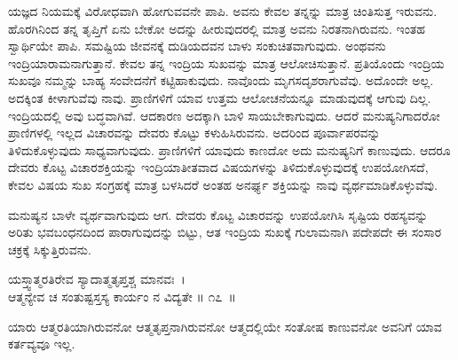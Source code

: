 ಯಜ್ಞದ ನಿಯಮಕ್ಕೆ ವಿರೋಧವಾಗಿ ಹೋಗುವವನೇ ಪಾಪಿ. ಅವನು ಕೇವಲ ತನ್ನನ್ನು ಮಾತ್ರ ಚಿಂತಿಸುತ್ತ ಇರುವನು. ಹೊರಗಿನಿಂದ ತನ್ನ ತೃಪ್ತಿಗೆ ಏನು ಬೇಕೋ ಅದನ್ನು ಹೀರುವುದರಲ್ಲಿ ಮಾತ್ರ ಅವನು ನಿರತನಾಗಿರುವನು. ಇಂತಹ ಸ್ವಾರ್ಥಿಯೇ ಪಾಪಿ. ಸಮಷ್ಟಿಯ ಜೀವನಕ್ಕೆ ದುಡಿಯದವನ ಬಾಳು ಸಂಕುಚಿತವಾಗುವುದು. ಅಂಥವನು ಇಂದ್ರಿಯಾರಾಮನಾಗುತ್ತಾನೆ. ಕೇವಲ ತನ್ನ ಇಂದ್ರಿಯ ಸುಖವನ್ನು ಮಾತ್ರ ಆಲೋಚಿಸುತ್ತಾನೆ. ಪ್ರತಿಯೊಂದು ಇಂದ್ರಿಯ ಸುಖವೂ ನಮ್ಮನ್ನು ಬಾಹ್ಯ ಸಂವೇದನೆಗೆ ಕಟ್ಟಿಹಾಕುವುದು. ನಾವೊಂದು ಮೃಗಸದೃಶರಾಗುವೆವು. ಅದೊಂದೇ ಅಲ್ಲ. ಅದಕ್ಕಿಂತ ಕೀಳಾಗುವೆವು ನಾವು. ಪ್ರಾಣಿಗಳಿಗೆ ಯಾವ ಉತ್ತಮ ಆಲೋಚನೆಯನ್ನೂ ಮಾಡುವುದಕ್ಕೆ ಆಗುವು ದಿಲ್ಲ. ಇಂದ್ರಿಯದಲ್ಲಿ ಅವು ಬದ್ಧವಾಗಿವೆ. ಆದಕಾರಣ ಅದಕ್ಕಾಗಿ ಬಾಳಿ ಸಾಯಬೇಕಾಗುವುದು. ಆದರೆ ಮನುಷ್ಯನಿಗಾದರೋ ಪ್ರಾಣಿಗಳಲ್ಲಿ ಇಲ್ಲದ ವಿಚಾರವನ್ನು ದೇವರು ಕೊಟ್ಟು ಕಳುಹಿಸಿರುವನು. ಅದರಿಂದ ಪೂರ್ವಾಪರವನ್ನು ತಿಳಿದುಕೊಳ್ಳುವುದು ಸಾಧ್ಯವಾಗುವುದು. ಪ್ರಾಣಿಗಳಿಗೆ ಯಾವುದು ಕಾಣದೋ ಅದು ಮನುಷ್ಯನಿಗೆ ಕಾಣುವುದು. ಆದರೂ ದೇವರು ಕೊಟ್ಟ ವಿಚಾರಶಕ್ತಿಯನ್ನು ಇಂದ್ರಿಯಾತೀತವಾದ ವಿಷಯಗಳನ್ನು ತಿಳಿದುಕೊಳ್ಳುವುದಕ್ಕೆ ಉಪಯೋಗಿಸದೆ, ಕೇವಲ ವಿಷಯ ಸುಖ ಸಂಗ್ರಹಕ್ಕೆ ಮಾತ್ರ ಬಳಸಿದರೆ ಅಂತಹ ಅನರ್ಘ್ಯ ಶಕ್ತಿಯನ್ನು ನಾವು ವ್ಯರ್ಥಮಾಡಿಕೊಳ್ಳುವೆವು.

ಮನುಷ್ಯನ ಬಾಳೇ ವ್ಯರ್ಥವಾಗುವುದು ಆಗ. ದೇವರು ಕೊಟ್ಟ ವಿಚಾರವನ್ನು ಉಪಯೋಗಿಸಿ ಸೃಷ್ಟಿಯ ರಹಸ್ಯವನ್ನು ಅರಿತು ಭವಬಂಧನದಿಂದ ಪಾರಾಗುವುದನ್ನು ಬಿಟ್ಟು, ಆತ ಇಂದ್ರಿಯ ಸುಖಕ್ಕೆ ಗುಲಾಮನಾಗಿ ಪದೇಪದೇ ಈ ಸಂಸಾರ ಚಕ್ರಕ್ಕೆ ಸಿಕ್ಕುತ್ತಿರುವನು.

\begin{shloka}
ಯಸ್ತ್ವಾತ್ಮರತಿರೇವ ಸ್ಯಾದಾತ್ಮತೃಪ್ತಶ್ಚ ಮಾನವಃ~।\\ಆತ್ಮನ್ಯೇವ ಚ ಸಂತುಷ್ಟಸ್ತಸ್ಯ ಕಾರ್ಯಂ ನ ವಿದ್ಯತೇ \hfill॥ ೧೭~॥
\end{shloka}

\begin{artha}
ಯಾರು ಆತ್ಮರತಿಯಾಗಿರುವನೋ ಆತ್ಮತೃಪ್ತನಾಗಿರುವನೋ ಆತ್ಮದಲ್ಲಿಯೇ ಸಂತೋಷ ಕಾಣು\-ವನೋ ಅವನಿಗೆ ಯಾವ ಕರ್ತವ್ಯವೂ ಇಲ್ಲ.
\end{artha}

